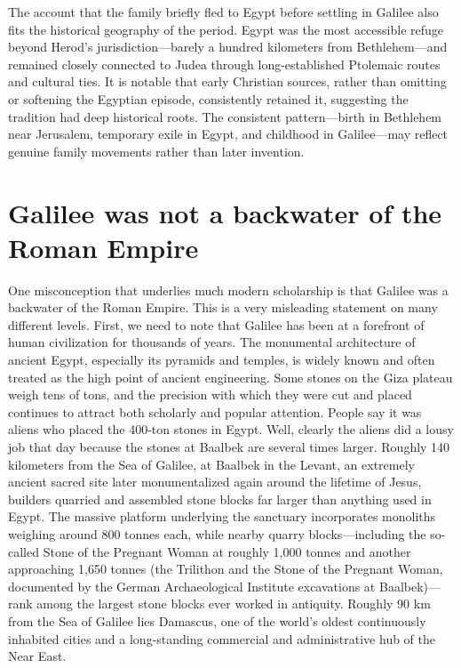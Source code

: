 The account that the family briefly fled to Egypt before settling in Galilee also fits the historical geography of the period.
Egypt was the most accessible refuge beyond Herod’s jurisdiction---barely a hundred kilometers from Bethlehem---and remained closely connected to Judea through long-established Ptolemaic routes and cultural ties.
It is notable that early Christian sources, rather than omitting or softening the Egyptian episode, consistently retained it, suggesting the tradition had deep historical roots.
The consistent pattern---birth in Bethlehem near Jerusalem, temporary exile in Egypt, and childhood in Galilee---may reflect genuine family movements rather than later invention.

\section{Galilee was not a backwater of the Roman Empire}\label{sec:galilee-was-not-a-backwater-of-the-roman-empire}
One misconception that underlies much modern scholarship is that Galilee was a backwater of the Roman Empire.
This is a very misleading statement on many different levels.
First, we need to note that Galilee has been at a forefront of human civilization for thousands of years.
The monumental architecture of ancient Egypt, especially its pyramids and temples, is widely known and often treated as the high point of ancient engineering.
Some stones on the Giza plateau weigh tens of tons, and the precision with which they were cut and placed continues to attract both scholarly and popular attention.
People say it was aliens who placed the 400-ton stones in Egypt.
Well, clearly the aliens did a lousy job that day because the stones at Baalbek are several times larger.
Roughly 140 kilometers from the Sea of Galilee, at Baalbek in the Levant, an extremely ancient sacred site later monumentalized again around the lifetime of Jesus, builders quarried and assembled stone blocks far larger than anything used in Egypt.
The massive platform underlying the sanctuary incorporates monoliths weighing around 800 tonnes each, while nearby quarry blocks---including the so-called Stone of the Pregnant Woman at roughly 1,000 tonnes and another approaching 1,650 tonnes (the Trilithon and the Stone of the Pregnant Woman, documented by the German Archaeological Institute excavations at Baalbek)---rank among the largest stone blocks ever worked in antiquity.
Roughly 90 km from the Sea of Galilee lies Damascus, one of the world's oldest continuously inhabited cities and a long-standing commercial and administrative hub of the Near East.
